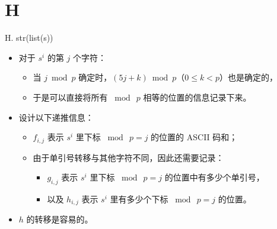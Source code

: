 \documentclass[9pt]{ctexbeamer}
\newcommand{\setParDis}{\setlength{\parskip}{6pt}}
\begin{document}
\section{H}

\begin{frame}
\setParDis

H. str(list(s))

\begin{itemize}
	\item 对于 $s ^ i$ 的第 $j$ 个字符：
		\begin{itemize}
			\item 当 $j \bmod p$ 确定时，$(5j + k) \bmod p$（$0 \le k < p$）也是确定的，
			\item 于是可以直接将所有 $\bmod ~ p$ 相等的位置的信息记录下来。
		\end{itemize}
	\item 设计以下递推信息：
		\begin{itemize}
			\item $f_{i,j}$ 表示 $s^i$ 里下标 $\bmod ~ p=j$ 的位置的 ASCII 码和；
			\item 由于单引号转移与其他字符不同，因此还需要记录：
				\begin{itemize}
					\item $g_{i,j}$ 表示 $s^i$ 里下标 $\bmod ~ p=j$ 的位置中有多少个单引号，
					\item 以及 $h_{i,j}$ 表示 $s^i$ 里有多少个下标 $\bmod ~ p=j$ 的位置。
				\end{itemize}
		\end{itemize}
	\item $h$ 的转移是容易的。
\end{itemize}

\end{frame}
\end{document}
